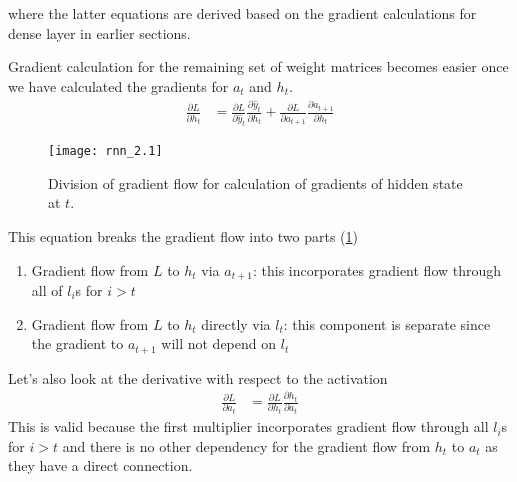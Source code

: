 \documentclass[../../deep_learning_notes.tex]{subfiles}
\begin{document}
where the latter equations are derived based on the gradient calculations for dense layer in earlier sections.\newline

Gradient calculation for the remaining set of weight matrices becomes easier once we have calculated the gradients for $a_{t}$ and $h_{t}$.
\begin{align*}
    \frac{\partial{L}}{\partial{h_{t}}} &= \frac{\partial{L}}{\partial{\hat{y}_{t}}} \frac{\partial{\hat{y}_{t}}}{\partial{h_{t}}} + \frac{\partial{L}}{\partial{a_{t+1}}} \frac{\partial{a_{t+1}}}{\partial{h_{t}}}
\end{align*}

\begin{figure}[h]
    \texttt{[image: rnn\_2.1]}
    \centering
    \caption {Division of gradient flow for calculation of gradients of hidden state at $t$.}
    \label{fig:rnn_21} %
\end{figure}


This equation breaks the gradient flow into two parts (\ref{fig:rnn_21})
\begin{enumerate}
    \item Gradient flow from $L$ to $h_{t}$ via $a_{t+1}$: this incorporates gradient flow through all of $l_{i}$s for $i > t$
    \item Gradient flow from $L$ to $h_{t}$ directly via $l_{t}$: this component is separate since the gradient to $a_{t+1}$ will not depend on $l_{t}$
\end{enumerate}

Let's also look at the derivative with respect to the activation
\begin{align*}
    \frac{\partial{L}}{\partial{a_{t}}} &= \frac{\partial{L}}{\partial{h_{t}}} \frac{\partial{h_{t}}}{\partial{a_{t}}}
\end{align*}
This is valid because the first multiplier incorporates gradient flow through all $l_{i}$s for $i > t$ and there is no other dependency for the gradient flow from $h_{t}$ to $a_{t}$ as they have a direct connection.\newline
\end{document}
